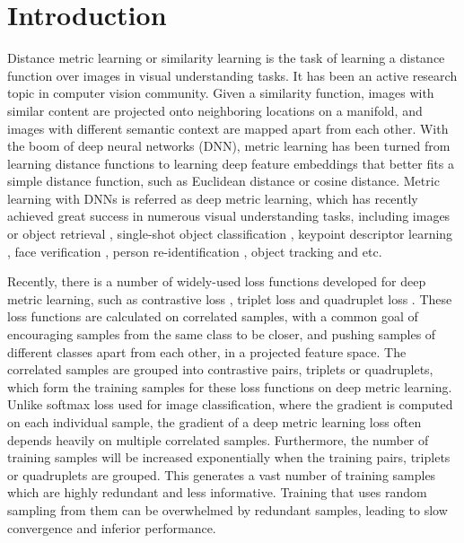 \documentclass[runningheads]{llncs}
\begin{document}
 	\section{Introduction}
Distance metric learning or similarity learning is the task of learning a distance function over images in visual understanding tasks. It has been an active research topic in computer vision community. Given a similarity function, images with similar content are projected onto neighboring locations on a manifold, and images with different semantic context are mapped apart from each other.
With the boom of deep neural networks (DNN), metric learning has been turned from learning distance functions  to learning deep feature embeddings that better fits a simple distance function, such as Euclidean distance or cosine distance. Metric learning with DNNs is referred as deep metric learning, which has recently achieved great success in numerous visual understanding tasks, including images or object retrieval \cite{song2016deep,ustinova2016learning,wohlhart2015learning}, single-shot object classification \cite{ustinova2016learning,wohlhart2015learning,waltner2016bacon}, keypoint descriptor learning \cite{kumar2016learning,simo2015discriminative}, face verification \cite{schroff2015facenet,parkhi2015deep}, person re-identification \cite{ustinova2016learning,shi2016embedding}, object tracking \cite{tao2016siamese} and etc.

Recently, there is a number of widely-used loss functions developed for deep metric learning, such as contrastive loss \cite{sun2014deep,hadsell2006dimensionality}, triplet loss \cite{schroff2015facenet} and quadruplet loss \cite{Chen_2017_CVPR}. These loss functions are calculated on correlated samples, with a common goal of encouraging samples from the same class to be closer, and pushing samples of different classes apart from each other, in a projected feature space. The correlated samples are grouped into contrastive pairs, triplets or quadruplets, which form the training samples for these loss functions on deep metric learning.
Unlike softmax loss used for image classification, where the gradient is computed on each individual sample, the gradient of a deep metric learning loss often depends heavily on multiple correlated  samples.
Furthermore, the number of training samples will be increased exponentially when the training pairs, triplets or quadruplets are grouped. This generates a vast number of training samples which are highly redundant and less informative. Training that uses random sampling from them can be overwhelmed by redundant samples, leading to slow convergence and inferior performance.
\end{document}
